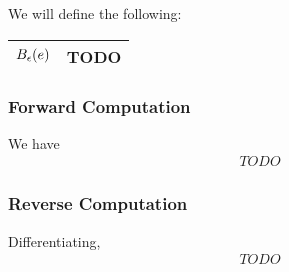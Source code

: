 We will define the following: \begin{center}\begin{tabular}{r|l}
	\(B_{\epsilon}\pof{e}\) & TODO \\ \hline
\end{tabular}\end{center}

\subsubsection{Forward Computation}
We have \begin{align*}
	TODO
\end{align*}

\subsubsection{Reverse Computation}
Differentiating, \begin{align*}
	TODO
\end{align*}

